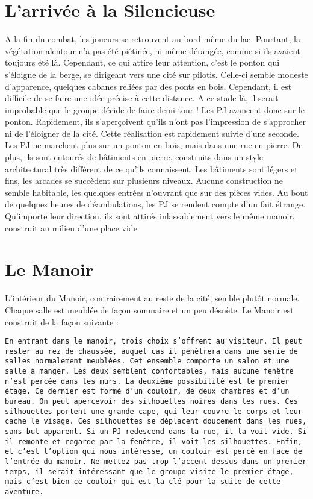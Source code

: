 \documentclass[a4paper, 11pt]{article}
\begin{document}
\section{L'arrivée à la Silencieuse}
A la fin du combat, les joueurs se retrouvent au bord même du lac. Pourtant, la végétation alentour n'a pas été piétinée, ni même dérangée, comme si ils avaient toujours été là. Cependant, ce qui attire leur attention, c'est le ponton qui s'éloigne de la berge, se dirigeant vers une cité sur pilotis. Celle-ci semble modeste d'apparence, quelques cabanes reliées par des ponts en bois. Cependant, il est difficile de se faire une idée précise à cette distance. 
\newline
A ce stade-là, il serait improbable que le groupe décide de faire demi-tour ! Les PJ avancent donc sur le ponton. Rapidement, ils s'aperçoivent qu'ils n'ont pas l'impression de s'approcher ni de l'éloigner de la cité. Cette réalisation est rapidement suivie d'une seconde. Les PJ ne marchent plus sur un ponton en bois, mais dans une rue en pierre. De plus, ils sont entourés de bâtiments en pierre, construits dans un style architectural très différent de ce qu'ils connaissent. Les bâtiments sont légers et fins, les arcades se succèdent sur plusieurs niveaux. Aucune construction ne semble habitable, les quelques entrées n'ouvrant que sur des pièces vides. Au bout de quelques heures de déambulations, les PJ se rendent compte d'un fait étrange. Qu'importe leur direction, ils sont attirés inlassablement vers le même manoir, construit au milieu d'une place vide.
\section{Le Manoir}
L'intérieur du Manoir, contrairement au reste de la cité, semble plutôt normale. Chaque salle est meublée de façon sommaire et un peu désuète. Le Manoir est construit de la façon suivante :
\begin{flushright}
\texttt{En entrant dans le manoir, trois choix s'offrent au visiteur. Il peut rester au rez de chaussée, auquel cas il pénétrera dans une série de salles normalement meublées. Cet ensemble comporte un salon et une salle à manger. Les deux semblent confortables, mais aucune fenêtre n'est percée dans les murs. 
\newline
La deuxième possibilité est le premier étage. Ce dernier est formé d'un couloir, de deux chambres et d'un bureau. On peut apercevoir des silhouettes noires dans les rues. Ces silhouettes portent une grande cape, qui leur couvre le corps et leur cache le visage. Ces silhouettes se déplacent doucement dans les rues, sans but apparent. Si un PJ redescend dans la rue, il la voit vide. Si il remonte et regarde par la fenêtre, il voit les silhouettes.
\newline
Enfin, et c'est l'option qui nous intéresse, un couloir est percé en face de l'entrée du manoir. Ne mettez pas trop l'accent dessus dans un premier temps, il serait intéressant que le groupe visite le premier étage, mais c'est bien ce couloir qui est la clé pour la suite de cette aventure.}
\end{flushright}
\end{document}
